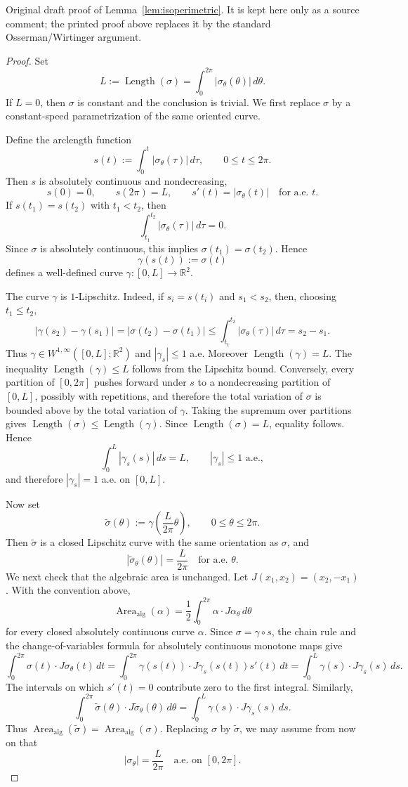 \documentclass[11pt]{amsart}
\numberwithin{equation}{section}
\theoremstyle{remark}
\newcommand{\R}{\mathbb{R}}
\newcommand{\AlgArea}{\operatorname{Area}_{\mathrm{alg}}}
\DeclareMathOperator{\Length}{Length}
\begin{document}
\iffalse
Original draft proof of Lemma~\ref{lem:isoperimetric}. It is kept here only as a source comment; the printed proof above replaces it by the
standard Osserman/Wirtinger argument.
\begin{proof}
Set
\[
L:=\Length(\sigma)=\int_0^{2\pi}|\sigma_\theta(\theta)|\, d\theta.
\]
If $L=0$, then $\sigma$ is constant and the conclusion is trivial. We first replace $\sigma$ by a constant-speed parametrization of the same
oriented curve.

Define the arclength function
\[
s(t):=\int_0^t |\sigma_\theta(\tau)|\, d\tau,
\qquad 0\le t\le 2\pi.
\]
Then $s$ is absolutely continuous and nondecreasing,
\[
s(0)=0,\qquad s(2\pi)=L,
\qquad s'(t)=|\sigma_\theta(t)|
\quad\text{for a.e. }t.
\]
If $s(t_1)=s(t_2)$ with $t_1<t_2$, then
\[
\int_{t_1}^{t_2}|\sigma_\theta(\tau)|\, d\tau=0.
\]
Since $\sigma$ is absolutely continuous, this implies $\sigma(t_1)=\sigma(t_2)$. Hence
\[
\gamma(s(t)):=\sigma(t)
\]
defines a well-defined curve $\gamma\colon[0,L]\to\R^2$.

The curve $\gamma$ is $1$-Lipschitz. Indeed, if $s_i=s(t_i)$ and $s_1<s_2$, then, choosing $t_1\le t_2$,
\[
|\gamma(s_2)-\gamma(s_1)|
=|\sigma(t_2)-\sigma(t_1)|
\le \int_{t_1}^{t_2}|\sigma_\theta(\tau)|\, d\tau
=s_2-s_1.
\]
Thus $\gamma\in W^{1,\infty}([0,L];\R^2)$ and $|\gamma_s|\le1$ a.e. Moreover $\Length(\gamma)=L$. The inequality $\Length(\gamma)\le L$
follows from the Lipschitz bound. Conversely, every partition of $[0,2\pi]$ pushes forward under $s$ to a nondecreasing partition of $[0,L]$,
possibly with repetitions, and therefore the total variation of $\sigma$ is bounded above by the total variation of $\gamma$. Taking the
supremum over partitions gives $\Length(\sigma)\le \Length(\gamma)$. Since $\Length(\sigma)=L$, equality follows. Hence
\[
\int_0^L |\gamma_s(s)|\, ds=L,
\qquad |\gamma_s|\le1\text{ a.e.},
\]
and therefore $|\gamma_s|=1$ a.e. on $[0,L]$.

Now set
\[
\widetilde{\sigma}(\theta):=\gamma\left(\frac{L}{2\pi}\theta\right),
\qquad 0\le\theta\le2\pi.
\]
Then $\widetilde{\sigma}$ is a closed Lipschitz curve with the same orientation as $\sigma$, and
\[
|\widetilde{\sigma}_\theta(\theta)|=\frac{L}{2\pi}
\quad\text{for a.e. }\theta.
\]
We next check that the algebraic area is unchanged. Let $J(x_1,x_2)=(x_2,-x_1)$. With the convention above,
\[
\AlgArea(\alpha)=\frac12\int_0^{2\pi}\alpha\cdot J\alpha_\theta\, d\theta
\]
for every closed absolutely continuous curve $\alpha$. Since $\sigma=\gamma\circ s$, the chain rule and the change-of-variables formula for
absolutely continuous monotone maps give
\[
\int_0^{2\pi}\sigma(t)\cdot J\sigma_\theta(t)\, dt
=\int_0^{2\pi}\gamma(s(t))\cdot J\gamma_s(s(t))s'(t)\, dt
=\int_0^L \gamma(s)\cdot J\gamma_s(s)\, ds.
\]
The intervals on which $s'(t)=0$ contribute zero to the first integral. Similarly,
\[
\int_0^{2\pi}\widetilde{\sigma}(\theta)\cdot J\widetilde{\sigma}_\theta(\theta)\, d\theta
=\int_0^L \gamma(s)\cdot J\gamma_s(s)\, ds.
\]
Thus $\AlgArea(\widetilde{\sigma})=\AlgArea(\sigma)$. Replacing $\sigma$ by $\widetilde{\sigma}$, we may assume from now on that
\[
|\sigma_\theta|=\frac{L}{2\pi}
\quad\text{a.e. on }[0,2\pi].
\]


\end{proof}
\end{document}
